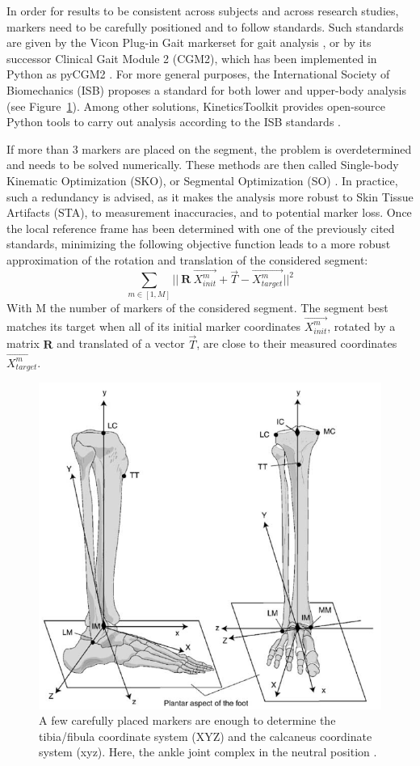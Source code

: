 In order for results to be consistent across subjects and across research studies, markers need to be carefully positioned and to follow standards. Such standards are given by the Vicon Plug-in Gait markerset for gait analysis \cite{Davis1991}, or by its successor Clinical Gait Module 2 (CGM2), which has been implemented in Python as pyCGM2 \cite{Leboeuf2019b}. For more general purposes, the International Society of Biomechanics (ISB) proposes a standard for both lower and upper-body analysis \cite{Wu2002, Wu2005} (see Figure~\ref{fig_isb}). Among other solutions, KineticsToolkit provides open-source Python tools to carry out analysis according to the ISB standards \cite{Chenier2021}.

If more than 3 markers are placed on the segment, the problem is overdetermined and needs to be solved numerically. These methods are then called Single-body Kinematic Optimization (SKO), or Segmental Optimization (SO) \cite{Lu1999}. In practice, such a redundancy is advised, as it makes the analysis more robust to Skin Tissue Artifacts (STA), to measurement inaccuracies, and to potential marker loss. Once the local reference frame has been determined with one of the previously cited standards, minimizing the following objective function leads to a more robust approximation of the rotation and translation of the considered segment: 
\begin{equation}
  \sum_{m \in [1,M]}
  ||\ \textbf{R} \ \overrightarrow{X_{init}^m} + \overrightarrow{T} - \overrightarrow{X_{target}^m} ||^2
\end{equation} 
With M the number of markers of the considered segment. The segment best matches its target when all of its initial marker coordinates $\overrightarrow{X_{init}^m}$, rotated by a matrix $\textbf{R}$ and translated of a vector $\overrightarrow{T}$, are close to their measured coordinates $\overrightarrow{X_{target}^m}$. 

\begin{figure}[!ht]
	\centering
	\def\svgwidth{1\columnwidth}
	\fontsize{10pt}{10pt}\selectfont
	\includegraphics[width=0.7\linewidth]{"../Chap2/Figures/ISBaxis.PNG"}
	\caption{A few carefully placed markers are enough to determine the tibia/fibula coordinate system (XYZ) and the calcaneus coordinate system (xyz). Here, the ankle joint complex in the neutral position \cite{Wu2002}.}
	\label{fig_isb}
\end{figure}


